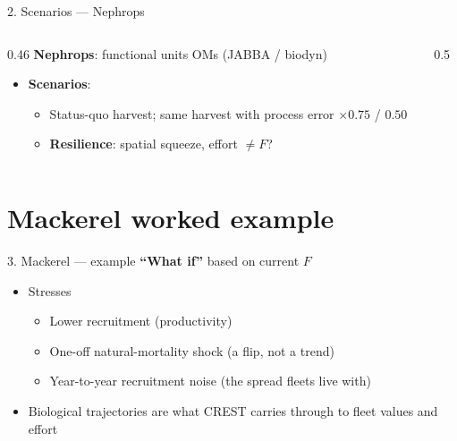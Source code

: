 \documentclass[12pt,aspectratio=169]{beamer}
\begin{document}
\begin{frame}{2. Scenarios --- Nephrops}
  \begin{columns}[T]
    \begin{column}{0.46\textwidth}
      \textbf{Nephrops}: functional units OMs (JABBA / biodyn)
      \begin{itemize}
        \item \textbf{Scenarios}:
          \begin{itemize}
            \item Status-quo harvest; same harvest with process error $\times 0.75$ / $0.50$
            \item \textbf{Resilience}: spatial squeeze, effort $\neq F$?
          \end{itemize}
      \end{itemize}
    \end{column}
    \begin{column}{0.5\textwidth}
      \centering
      \\
    \end{column}
  \end{columns}
\end{frame}

\section{Mackerel worked example}

\begin{frame}{3. Mackerel --- example}
  \textbf{``What if''} based on current $F$
  \begin{itemize}
    \item Stresses
      \begin{itemize}
        \item Lower recruitment (productivity)
        \item One-off natural-mortality shock (a flip, not a trend)
        \item Year-to-year recruitment noise (the spread fleets live with)
      \end{itemize}
    \item Biological trajectories are what CREST carries through to fleet values and effort
  \end{itemize}
\end{frame}
\end{document}
